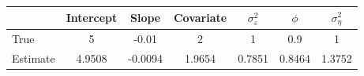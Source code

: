 \begin{tabular}{lcccccc}
\toprule
& Intercept & Slope & Covariate & $\sigma_\varepsilon^2$ & $\phi$ & $\sigma_\eta^2$ \\
\midrule
True & 5 & -0.01 & 2 & 1 & 0.9 & 1 \\
Estimate & 4.9508 & -0.0094 & 1.9654 & 0.7851 & 0.8464 & 1.3752 \\
\bottomrule
\end{tabular}
